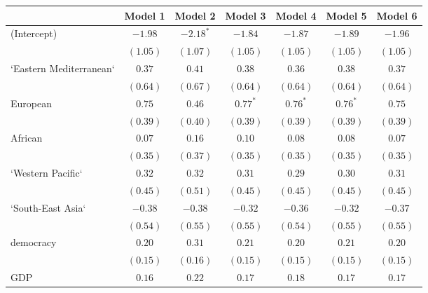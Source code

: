 
\begin{table}[!h]
\begin{center}
\begin{tabular}{l c c c c c c }
\toprule
 & Model 1 & Model 2 & Model 3 & Model 4 & Model 5 & Model 6 \\
\midrule
(Intercept)             & $-1.98$      & $-2.18^{*}$  & $-1.84$      & $-1.87$      & $-1.89$      & $-1.96$      \\
                        & $(1.05)$     & $(1.07)$     & $(1.05)$     & $(1.05)$     & $(1.05)$     & $(1.05)$     \\
`Eastern Mediterranean` & $0.37$       & $0.41$       & $0.38$       & $0.36$       & $0.38$       & $0.37$       \\
                        & $(0.64)$     & $(0.67)$     & $(0.64)$     & $(0.64)$     & $(0.64)$     & $(0.64)$     \\
European                & $0.75$       & $0.46$       & $0.77^{*}$   & $0.76^{*}$   & $0.76^{*}$   & $0.75$       \\
                        & $(0.39)$     & $(0.40)$     & $(0.39)$     & $(0.39)$     & $(0.39)$     & $(0.39)$     \\
African                 & $0.07$       & $0.16$       & $0.10$       & $0.08$       & $0.08$       & $0.07$       \\
                        & $(0.35)$     & $(0.37)$     & $(0.35)$     & $(0.35)$     & $(0.35)$     & $(0.35)$     \\
`Western Pacific`       & $0.32$       & $0.32$       & $0.31$       & $0.29$       & $0.30$       & $0.31$       \\
                        & $(0.45)$     & $(0.51)$     & $(0.45)$     & $(0.45)$     & $(0.45)$     & $(0.45)$     \\
`South-East Asia`       & $-0.38$      & $-0.38$      & $-0.32$      & $-0.36$      & $-0.32$      & $-0.37$      \\
                        & $(0.54)$     & $(0.55)$     & $(0.55)$     & $(0.54)$     & $(0.55)$     & $(0.55)$     \\
democracy               & $0.20$       & $0.31$       & $0.21$       & $0.20$       & $0.21$       & $0.20$       \\
                        & $(0.15)$     & $(0.16)$     & $(0.15)$     & $(0.15)$     & $(0.15)$     & $(0.15)$     \\
GDP                     & $0.16$       & $0.22$       & $0.17$       & $0.18$       & $0.17$       & $0.17$       \\

\end{tabular}
\end{center}
\end{table}
